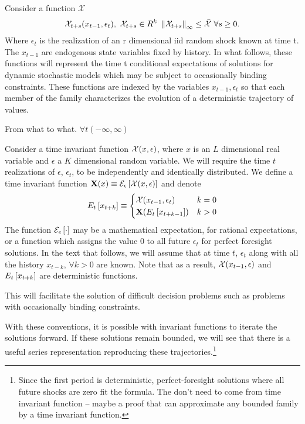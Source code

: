 \documentclass[12pt]{article}
\begin{document}
 Consider a function $\mathcal{X} $
 \begin{gather}
   \mathcal{X}_{t+s}(x_{t-1},\epsilon_t), \,\,\mathcal{X}_{t+s} \in{R^k}\,\,\left\lVert\mathcal{X}_{t+s}\right\rVert_\infty  \le \bar{\mathcal{X}}\,\,\forall s\ge 0 \label{fFamily}.
 \end{gather}
Where $\epsilon_t$ is the realization of an r dimensional iid random shock  known at time t. The $x_{t-1}$ are endogenous state variables fixed by history.  
In what follows, these functions will represent the time t conditional expectations of solutions for dynamic stochastic models which may be subject to occasionally binding constraints.  These functions are indexed by the variables $x_{t-1}, \epsilon_t$ so that each member of the family characterizes the evolution of a deterministic trajectory of values.

From what to what.  $\forall t (-\infty,\infty)$ 

Consider a time invariant function $\mathcal{X}(x,\epsilon)$, where $x$ is an $L$ dimensional real variable and $\epsilon$ a $K$ dimensional random variable. 
We will require
the time $t$ realizations of $\epsilon$, $\epsilon_t$, to be independently and identically distributed.
We define a time invariant function $\mathbf{X}(x)\equiv \mathcal{E}_{\epsilon} \left [\mathcal{X}(x,\epsilon) \right ]$ and denote
\begin{gather*}
E_{t} \left [x_{t+k} \right ]\equiv\begin{cases}
\mathcal{X}{(x_{t-1},\epsilon_t)} &k=0\\
\mathbf{X}{(E_{t} \left [x_{t+k-1} \right ])} &k>0
\end{cases}
\end{gather*}
The function $\mathcal{E}_{\epsilon} \left [\cdot \right ]$ may be a mathematical expectation, for rational expectations, or a function which assigns the value $0$ to all future $\epsilon_t$ for perfect foresight solutions.
In the text that follows, we will assume that at time $t$, $\epsilon_t$ along with all the history $x_{t-k},\, \forall k>0$ are known.
Note that as a result, 
$\mathcal{X}{(x_{t-1},\epsilon)}$ and 
$E_{t} \left [x_{t+k} \right ]$ are deterministic functions.  

This will facilitate the solution of difficult decision problems such as problems with
occasionally binding constraints. 


With these conventions,  it is possible with invariant functions to iterate the solutions forward.
If these solutions remain bounded, we will see that there is a useful series representation
 reproducing these trajectories.\footnote{
  Since the first
period is deterministic,  perfect-foresight solutions 
where all future shocks are zero fit the formula. The don't need to come from time invariant function -- maybe a proof that can approximate any bounded family by a time invariant function.
}
\end{document}
